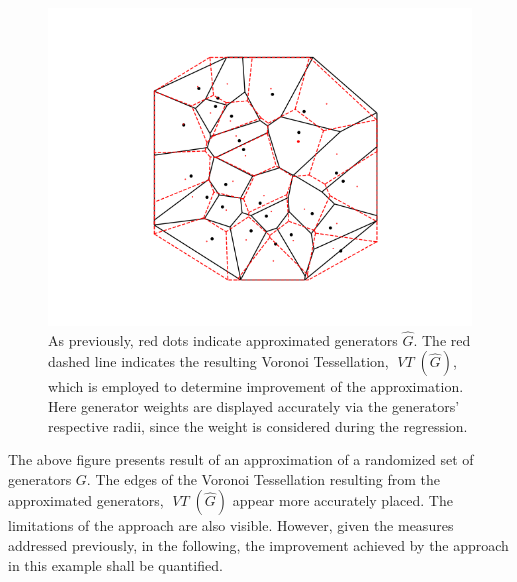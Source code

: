 \documentclass[a4paper]{article}
\DeclareMathOperator*{\VT}{\textit{VT}}
\begin{document}
\begin{figure}[H]
	\includegraphics[width=\textwidth]{generator_approximation.png}
	\caption{As previously, red dots indicate approximated generators \(\hat{G}\). The red dashed line indicates
		the resulting Voronoi Tessellation, \(\VT(\hat{G})\), which is employed to determine improvement of the approximation.
		Here generator weights are displayed accurately via the generators' respective radii, since the weight is considered
		during the regression.}
\end{figure}

The above figure presents result of an approximation of a randomized set of generators \(G\).
The edges of the Voronoi Tessellation resulting from the approximated generators, \(\VT(\hat{G})\) appear more accurately placed.
The limitations of the approach are also visible. However, given the measures addressed previously,
in the following, the improvement achieved by the approach in this example shall be quantified.
\end{document}
